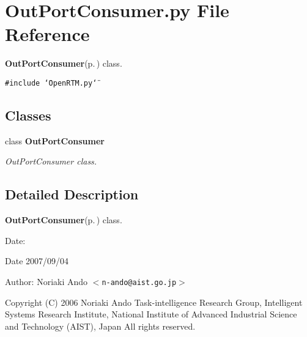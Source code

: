 \section{Out\-Port\-Consumer.py File Reference}
\label{OutPortConsumer_8py}
{\bf Out\-Port\-Consumer}{\rm (p.\,\pageref{classOutPortConsumer})} class. 

{\tt \#include \char`\"{}Open\-RTM.py\char`\"{}}\par
\subsection*{Classes}
\begin{CompactItemize}
\item 
class {\bf Out\-Port\-Consumer}
\begin{CompactList}\small\item\em Out\-Port\-Consumer class. \item\end{CompactList}\end{CompactItemize}


\subsection{Detailed Description}
{\bf Out\-Port\-Consumer}{\rm (p.\,\pageref{classOutPortConsumer})} class. 

\begin{Desc}
\item[Date:]\begin{Desc}
\item[Date]2007/09/04\end{Desc}
\end{Desc}
\begin{Desc}
\item[Author:]Noriaki Ando $<${\tt n-ando@aist.go.jp}$>$\end{Desc}
Copyright (C) 2006 Noriaki Ando Task-intelligence Research Group, Intelligent Systems Research Institute, National Institute of Advanced Industrial Science and Technology (AIST), Japan All rights reserved.
